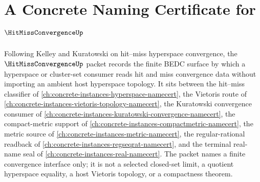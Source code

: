 \chapter{A Concrete Naming Certificate for $\HitMissConvergenceUp$}
\label{ch:concrete-instances-hit-miss-convergence-namecert}

Following Kelley and Kuratowski on hit--miss hyperspace convergence, the $\HitMissConvergenceUp$ packet records the finite BEDC surface by which a hyperspace or cluster-set consumer reads hit and miss convergence data without importing an ambient host hyperspace topology. It sits between the hit--miss classifier of \autoref{ch:concrete-instances-hyperspace-namecert}, the Vietoris route of \autoref{ch:concrete-instances-vietoris-topology-namecert}, the Kuratowski convergence consumer of \autoref{ch:concrete-instances-kuratowski-convergence-namecert}, the compact-metric support of \autoref{ch:concrete-instances-compactmetric-namecert}, the metric source of \autoref{ch:concrete-instances-metric-namecert}, the regular-rational readback of \autoref{ch:concrete-instances-regseqrat-namecert}, and the terminal real-name seal of \autoref{ch:concrete-instances-real-namecert}. The packet names a finite convergence interface only; it is not a selected closed-set limit, a quotient hyperspace equality, a host Vietoris topology, or a compactness theorem.

